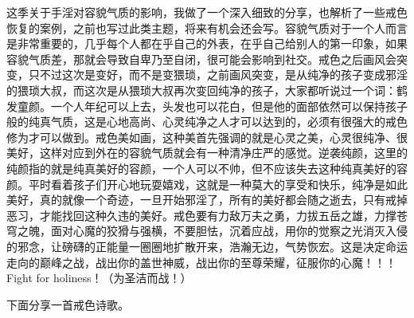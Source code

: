 这季关于手淫对容貌气质的影响，我做了一个深入细致的分享，也解析了一些戒色恢复的案例，之前也写过此类主题，将来有机会还会写。容貌气质对于一个人而言是非常重要的，几乎每个人都在乎自己的外表，在乎自己给别人的第一印象，如果容貌气质差，那就会导致自卑乃至自闭，很可能会影响到社交。戒色之后画风会突变，只不过这次是变好，而不是变猥琐，之前画风突变，是从纯净的孩子变成邪淫的猥琐大叔，而这次是从猥琐大叔再次变回纯净的孩子，大家都听说过一个词：鹤发童颜。一个人年纪可以上去，头发也可以花白，但是他的面部依然可以保持孩子般的纯真气质，这是心地高尚、心灵纯净之人才可以达到的，必须有很强大的戒色修为才可以做到。戒色美如画，这种美首先强调的就是心灵之美，心灵很纯净、很美好，这样对应到外在的容貌气质就会有一种清净庄严的感觉。逆袭纯颜，这里的纯颜指的就是纯真美好的容颜，一个人可以不帅，但不应该失去这种纯真美好的容颜。平时看着孩子们开心地玩耍嬉戏，这就是一种莫大的享受和快乐，纯净是如此美好，真的就像一个奇迹，一旦开始邪淫了，所有的美好都会随之逝去，只有戒掉恶习，才能找回这种久违的美好。戒色要有力敌万夫之勇，力拔五岳之雄，力撑苍穹之魄，面对心魔的狡猾与强横，不要胆怯，沉着应战，用你的觉察之光消灭入侵的邪念，让磅礴的正能量一圈圈地扩散开来，浩瀚无边，气势恢宏。这是决定命运走向的巅峰之战，战出你的盖世神威，战出你的至尊荣耀，征服你的心魔！！！Fight for holiness！（为圣洁而战！）

下面分享一首戒色诗歌。

